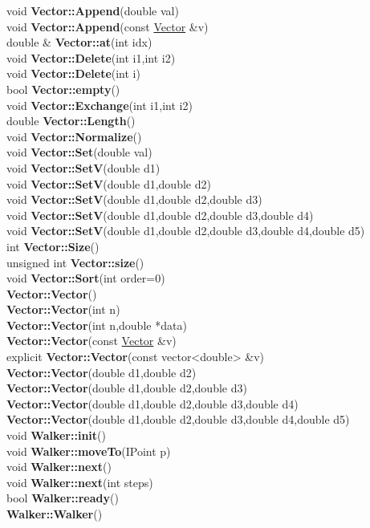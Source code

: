 \documentclass[10pt,titlepage]{article}
\def\functionlistentry#1#2#3#4#5#6{\noindent #1 {\bf #2}(#3) \dotfill #6\\}
\begin{document}
{{\functionlistentry{void}{Vector::Append}{double val}{245}{datastructures}{}
\functionlistentry{void}{Vector::Append}{const \hyperlink{Vector}{Vector} \&v}{246}{datastructures}{}
\functionlistentry{double \&}{Vector::at}{int idx}{233}{datastructures}{}
\functionlistentry{void}{Vector::Delete}{int i1,int i2}{248}{datastructures}{}
\functionlistentry{void}{Vector::Delete}{int i}{249}{datastructures}{}
\functionlistentry{bool}{Vector::empty}{}{236}{datastructures}{}
\functionlistentry{void}{Vector::Exchange}{int i1,int i2}{247}{datastructures}{}
\functionlistentry{double}{Vector::Length}{}{250}{datastructures}{}
\functionlistentry{void}{Vector::Normalize}{}{251}{datastructures}{}
\functionlistentry{void}{Vector::Set}{double val}{239}{datastructures}{}
\functionlistentry{void}{Vector::SetV}{double d1}{240}{datastructures}{}
\functionlistentry{void}{Vector::SetV}{double d1,double d2}{241}{datastructures}{}
\functionlistentry{void}{Vector::SetV}{double d1,double d2,double d3}{242}{datastructures}{}
\functionlistentry{void}{Vector::SetV}{double d1,double d2,double d3,double d4}{243}{datastructures}{}
\functionlistentry{void}{Vector::SetV}{double d1,double d2,double d3,double d4,double d5}{244}{datastructures}{}
\functionlistentry{int}{Vector::Size}{}{234}{datastructures}{}
\functionlistentry{unsigned int}{Vector::size}{}{235}{datastructures}{}
\functionlistentry{void}{Vector::Sort}{int order=0}{252}{datastructures}{}
\functionlistentry{}{Vector::Vector}{}{224}{datastructures}{}
\functionlistentry{}{Vector::Vector}{int n}{225}{datastructures}{}
\functionlistentry{}{Vector::Vector}{int n,double *data}{226}{datastructures}{}
\functionlistentry{}{Vector::Vector}{const \hyperlink{Vector}{Vector} \&v}{227}{datastructures}{}
\functionlistentry{explicit}{Vector::Vector}{const vector<double> \&v}{228}{datastructures}{}
\functionlistentry{}{Vector::Vector}{double d1,double d2}{229}{datastructures}{}
\functionlistentry{}{Vector::Vector}{double d1,double d2,double d3}{230}{datastructures}{}
\functionlistentry{}{Vector::Vector}{double d1,double d2,double d3,double d4}{231}{datastructures}{}
\functionlistentry{}{Vector::Vector}{double d1,double d2,double d3,double d4,double d5}{232}{datastructures}{}
\functionlistentry{void}{Walker::init}{}{178}{datastructures}{}
\functionlistentry{void}{Walker::moveTo}{IPoint p}{177}{datastructures}{}
\functionlistentry{void}{Walker::next}{}{179}{datastructures}{}
\functionlistentry{void}{Walker::next}{int steps}{180}{datastructures}{}
\functionlistentry{bool}{Walker::ready}{}{181}{datastructures}{}
\functionlistentry{}{Walker::Walker}{}{174}{datastructures}{}
}}
\end{document}
